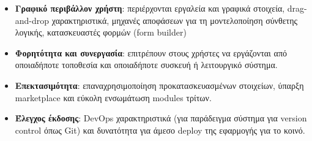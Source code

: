             \vspace{-0.5em}
            \begin{itemize}[label={\tiny \blacksquare}]
                \setlength\itemsep{-0.25em}
                \item \textbf{Γραφικό περιβάλλον χρήστη}: περιέρχονται εργαλεία και γραφικά στοιχεία, drag-and-drop χαρακτηριστικά, μηχανές αποφάσεων για τη μοντελοποίηση σύνθετης λογικής, κατασκευαστές φορμών (form builder)
                \item \textbf{Φορητότητα και συνεργασία}: επιτρέπουν στους χρήστες να εργάζονται από οποιαδήποτε τοποθεσία και οποιαδήποτε συσκευή ή λειτουργικό σύστημα.
                \item \textbf{Επεκτασιμότητα}: επαναχρησιμοποίηση προκατασκευασμένων στοιχείων, ύπαρξη marketplace και εύκολη ενσωμάτωση modules τρίτων.
                \item \textbf{Έλεγχος έκδοσης}: DevOps χαρακτηριστικά (για παράδειγμα σύστημα για version control όπως Git) και δυνατότητα για άμεσο deploy της εφαρμογής για το κοινό.
            \end{itemize}
            \vspace{-0.5em}

